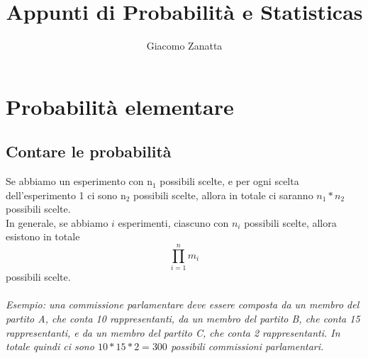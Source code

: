 \documentclass{article}
\title{Appunti di Probabilità e Statisticas}
\author{Giacomo Zanatta}
\begin{document}
\maketitle
\tableofcontents
\newpage
\section{Probabilità elementare}
\subsection{Contare le probabilità}
Se abbiamo un esperimento con n$_1$ possibili scelte, e per ogni scelta dell'esperimento 1 ci sono n$_2$ possibili scelte, allora in totale ci saranno $n_1*n_2$ possibili scelte.\\
In generale, se abbiamo $i$ esperimenti, ciascuno con $n_i$ possibili scelte, allora esistono in totale 
\begin{equation}
  \prod\limits_{i=1}^n m_i
\end{equation}
possibili scelte.\\ 
\\
\emph{
  Esempio: una commissione parlamentare deve essere composta da un membro del partito A, che conta 10 rappresentanti, da un membro del partito B, che conta 15 rappresentanti, e da un membro del   partito C, che conta 2 rappresentanti. In totale quindi ci sono $10*15*2 = 300$ possibili   commissioni parlamentari.
}
\\
\end{document}
